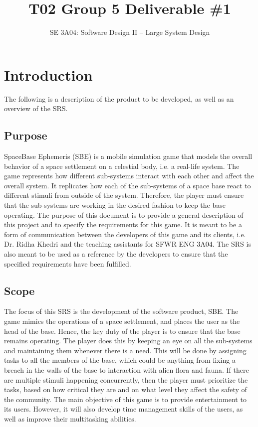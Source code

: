\documentclass[]{article}
\title{T02 Group 5 Deliverable \#1}
\author{SE 3A04: Software Design II -- Large System Design}
\begin{document}
\maketitle	

\section{Introduction}
\label{sec:introduction}

The following is a description of the product to be developed, as well as an overview of the SRS.

\subsection{Purpose}
\label{sub:purpose}
	SpaceBase Ephemeris (SBE) is a mobile simulation game that models the overall behavior of a space settlement on a celestial body, i.e. a real-life system. The game represents how different sub-systems interact with each other and affect the overall system. It replicates how each of the sub-systems of a space base react to different stimuli from outside of the system. Therefore, the player must ensure that the sub-systems are working in the desired fashion to keep the base operating. The purpose of this document is to provide a general description of this project and to specify the requirements for this game. It is meant to be a form of communication between the developers of this game and its clients, i.e. Dr. Ridha Khedri and the teaching assistants for SFWR ENG 3A04. The SRS is also meant to be used as a reference by the developers to ensure that the specified requirements have been fulfilled.

\subsection{Scope}
\label{sub:scope}
	The focus of this SRS is the development of the software product, SBE. The game mimics the operations of a space settlement, and places the user as the head of the base. Hence, the key duty of the player is to ensure that the base remains operating. The player does this by keeping an eye on all the sub-systems and maintaining them whenever there is a need. This will be done by assigning tasks to all the members of the base, which could be anything from fixing a breach in the walls of the base to interaction with alien flora and fauna. If there are multiple stimuli happening concurrently, then the player must prioritize the tasks, based on how critical they are and on what level they affect the safety of the community. The main objective of this game is to provide entertainment to its users. However, it will also develop time management skills of the users, as well as improve their multitasking abilities. 
\end{document}
